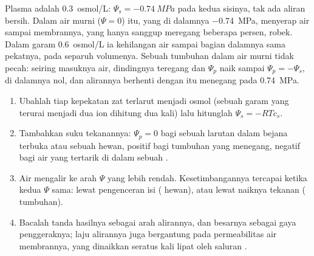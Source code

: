 \begin{example}\label{ex:b1:membranes-transport:redcell}
Plasma adalah \qty{0.3}{osmol/L}: $\Psi_s = \qty{-0.74}{MPa}$ pada kedua
sisinya, tak ada aliran bersih. Dalam air murni ($\Psi = 0$)  itu,
yang di dalamnya \qty{-0.74}{MPa}, menyerap air sampai membrannya, yang
hanya sanggup meregang beberapa persen, robek. Dalam garam
\qty{0.6}{osmol/L} ia kehilangan air sampai bagian dalamnya sama
pekatnya, pada separuh volumenya. Sebuah  tumbuhan dalam air murni
tidak pecah: seiring masuknya air, dindingnya teregang dan $\Psi_p$ naik
sampai $\Psi_p = -\Psi_s$,  di dalamnya nol, dan alirannya
berhenti dengan  itu menegang pada
\qty{0.74}{MPa}.
\end{example}

\begin{method}\label{met:b1:membranes-transport:psi}
\begin{enumerate}
  \item Ubahlah tiap kepekatan zat terlarut menjadi osmol (sebuah garam
        yang terurai menjadi dua ion dihitung dua kali) lalu hitunglah $\Psi_s =
        -RTc_s$.
  \item Tambahkan suku tekanannya: $\Psi_p = 0$ bagi sebuah larutan
        dalam bejana terbuka atau sebuah  hewan, positif bagi 
        tumbuhan yang menegang, negatif bagi air yang tertarik di dalam
        sebuah  .
  \item Air mengalir ke arah $\Psi$ yang lebih rendah. Kesetimbangannya
        tercapai ketika kedua $\Psi$ sama: lewat pengenceran isi 
        ( hewan), atau lewat naiknya tekanan ( tumbuhan).
  \item Bacalah tanda hasilnya sebagai arah alirannya, dan besarnya
        sebagai gaya penggeraknya; laju alirannya juga bergantung pada
        permeabilitas air membrannya, yang dinaikkan seratus kali lipat
        oleh saluran .
\end{enumerate}
\end{method}


